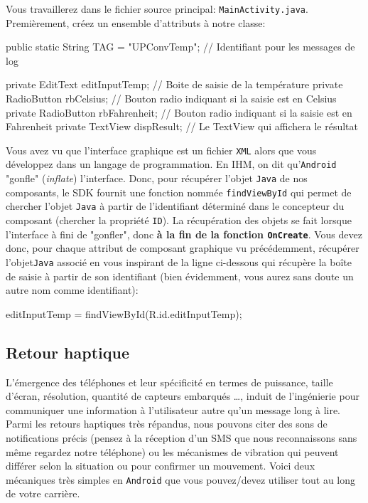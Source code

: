 \documentclass[a4paper,10pt]{article}
\newenvironment{boxcode}%
{\begin{tcolorbox}[breakable,colback=gray!5!white,colframe=black]}%
	{\end{tcolorbox}}
\begin{document}
Vous travaillerez dans le fichier source principal: \texttt{MainActivity.java}. Premièrement, créez un ensemble d'attributs à notre classe:


\begin{boxcode}
	\begin{javasansbord}
public static String TAG = "UPConvTemp"; // Identifiant pour les messages de log

private EditText editInputTemp; // Boite de saisie de la température
private RadioButton rbCelsius; // Bouton radio indiquant si la saisie est en Celsius
private RadioButton rbFahrenheit; // Bouton radio indiquant si la saisie est en Fahrenheit
private TextView dispResult; // Le TextView qui affichera le résultat
	\end{javasansbord}
\end{boxcode}

Vous avez vu que l'interface graphique est un fichier \texttt{XML} alors que vous développez dans un langage de programmation. En IHM, on dit qu'\texttt{Android} "gonfle" (\textit{inflate}) l'interface. Donc, pour récupérer l'objet \texttt{Java} de nos composants, le SDK fournit une fonction nommée \texttt{findViewById} qui permet de chercher l'objet \texttt{Java} à partir de l'identifiant déterminé dans le concepteur du composant (chercher la propriété \texttt{ID}). La récupération des objets se fait lorsque l'interface à fini de "gonfler",  donc \textbf{à la fin de la fonction \texttt{OnCreate}}. Vous devez donc, pour chaque attribut de composant graphique vu précédemment, récupérer l'objet\texttt{Java} associé en vous inspirant de la ligne ci-dessous qui récupère la boîte de saisie à partir de son identifiant (bien évidemment, vous aurez sans doute un autre nom comme identifiant):
\begin{boxcode}
	\begin{javasansbord}
editInputTemp = findViewById(R.id.editInputTemp);
	\end{javasansbord}
\end{boxcode}

\subsection{Retour haptique}

L'émergence des téléphones et leur spécificité en termes de puissance, taille d'écran, résolution, quantité de capteurs embarqués \ldots, induit de l'ingénierie pour communiquer une information à l'utilisateur autre qu'un message long à lire. Parmi les retours haptiques très répandus, nous pouvons citer des sons de notifications précis (pensez à la réception d'un SMS que nous reconnaissons sans même regardez notre téléphone) ou les mécanismes de vibration qui peuvent différer selon la situation ou pour confirmer un mouvement. Voici deux mécaniques très simples en \texttt{Android} que vous pouvez/devez utiliser tout au long de votre carrière.
\end{document}
